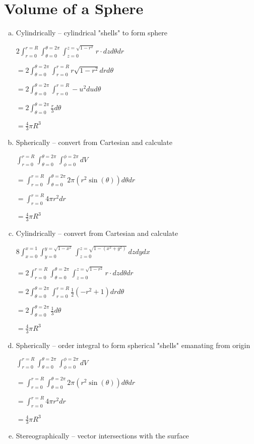 \documentclass{article}
\begin{document}
\section{Volume of a Sphere}
\begin{enumerate}[a.]
	\item Cylindrically -- cylindrical "shells" to form sphere

        $ 2\int_{r = 0}^{r = R} \int_{\theta = 0}^{\theta = 2\pi} \int_{z = 0}^{z = \sqrt{1-r^2}} r \cdot dz d\theta dr$

        $ = 2 \int_{\theta = 0}^{\theta = 2\pi} \int_{r = 0}^{r = R} r \sqrt{1-r^2} dr d\theta$

        $ = 2 \int_{\theta = 0}^{\theta = 2\pi} \int_{r = 0}^{r = R} -u^2 du d\theta$

        $ = 2 \int_{\theta = 0}^{\theta = 2\pi} \frac{r}{3} d\theta $

        $ = \frac{4}{3}\pi R^3 $

	\item Spherically -- convert from Cartesian and calculate

        $\int_{r=0}^{r=R}\int_{\theta=0}^{\theta=2\pi}\int_{\phi=0}^{\phi=2\pi} dV $

        $ = \int_{r=0}^{r=R}\int_{\theta=0}^{\theta=2\pi} 2\pi (r^2\sin(\theta))  d\theta dr $

        $ = \int_{r=0}^{r=R}4\pi r^2 dr $

        $ = \frac{4}{3}\pi R^3 $

	\item Cylindrically -- convert from Cartesian and calculate

        $8\int_{x = 0}^{x = 1} \int_{y = 0}^{y = \sqrt{1-x^2}} \int_{z = 0}^{z = \sqrt{1-(x^2+y^2)}} dz dy dx$

        $ = 2\int_{r = 0}^{r = R} \int_{\theta = 0}^{\theta = 2\pi} \int_{z = 0}^{z = \sqrt{1-r^2}} r \cdot dz d\theta dr$

        $ = 2 \int_{\theta = 0}^{\theta = 2\pi} \int_{r = 0}^{r = R} \frac{1}{2}\left(-r^2+1\right) dr d\theta$

        $ = 2 \int_{\theta = 0}^{\theta = 2\pi} \frac{1}{3} d\theta $

        $ = \frac{4}{3}\pi R^3 $

	\item Spherically -- order integral to form spherical "shells" emanating from origin

        $\int_{r=0}^{r=R}\int_{\theta=0}^{\theta=2\pi}\int_{\phi=0}^{\phi=2\pi} dV $

        $ = \int_{r=0}^{r=R}\int_{\theta=0}^{\theta=2\pi} 2\pi (r^2\sin(\theta))  d\theta dr $

        $ = \int_{r=0}^{r=R}4\pi r^2 dr $

        $ = \frac{4}{3}\pi R^3 $

	\item Stereographically -- vector intersections with the surface
\end{enumerate}
\end{document}
